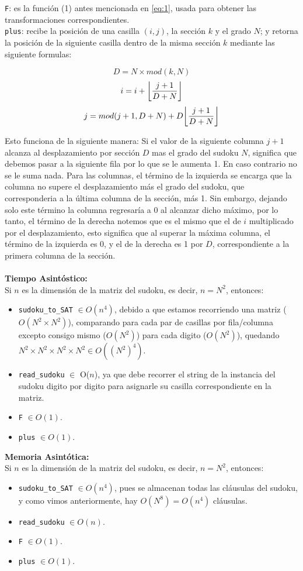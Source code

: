 \documentclass[letterpaper,12pt]{article}
\DeclarePairedDelimiter\floor{\lfloor}{\rfloor}
\begin{document}
\texttt{F}: es la función (1) antes mencionada en \ref{eq:1}, usada para obtener las transformaciones correspondientes.\\

\texttt{plus}: recibe la posición de una casilla $(i,j)$, la secci\'on $k$ y el grado $N$; y retorna la posición de la siguiente casilla dentro de la misma sección $k$ mediante las siguiente formulas:

	$$ D = N \times mod(k, N) $$
   	$$i = i + \floor*{\frac{j+1}{D+N}}$$
   	$$j = mod(j+1,D+N) + D \floor*{\frac{j+1}{D+N}}$$

Esto funciona de la siguiente manera: Si el valor de la siguiente columna $j+1$ alcanza al desplazamiento por sección $D$ mas el grado del sudoku $N$, significa que debemos pasar a la siguiente fila por lo que se le aumenta 1. En caso contrario no se le suma nada. Para las columnas, el término de la izquierda se encarga que la columna no supere el desplazamiento más el grado del sudoku, que corresponderia a la última columna de la sección, más 1. Sin embargo, dejando solo este término la columna regresaría a 0 al alcanzar dicho máximo, por lo tanto, el término de la derecha notemos que es el mismo que el de $i$ multiplicado por el desplazamiento, esto significa que al superar la máxima columna, el término de la izquierda es 0, y el de la derecha es 1 por $D$, correspondiente a la primera columna de la sección.\\ \\


\textbf{Tiempo Asintóstico:}\\
Si $n$ es la dimensi\'on de la matriz del sudoku, es decir, $n = N^2$, entonces:
\begin{itemize}
	\item \texttt{sudoku\_to\_SAT} $\in O(n^4)$, debido a que estamos recorriendo una matriz ($O(N^2 \times N^2)$), comparando para cada par de casillas por fila/columna excepto consigo mismo ($O(N^2)$) para cada digito ($O(N^2)$), quedando $N^2 \times N^2 \times N^2 \times N^2 \in O((N^2)^4)$.
	\item \texttt{read\_sudoku} $\in$ O($n$), ya que debe recorrer el string de la instancia del sudoku digito por digito para asignarle su casilla correspondiente en la matriz.
	\item \texttt{F} $\in O(1)$.
	\item \texttt{plus} $\in O(1)$.\\
\end{itemize} 


\textbf{Memoria Asintótica:}\\ 
Si $n$ es la dimensi\'on de la matriz del sudoku, es decir, $n = N^2$, entonces:
\begin{itemize}
	\item \texttt{sudoku\_to\_SAT} $\in O(n^4)$, pues se almacenan todas las cl\'ausulas del sudoku, y como vimos anteriormente, hay $O(N^8) = O(n^4)$ cl\'ausulas.
	\item \texttt{read\_sudoku} $\in O(n)$.
	\item \texttt{F} $\in O(1)$.
	\item \texttt{plus} $\in O(1)$.
\end{itemize}
\end{document}
